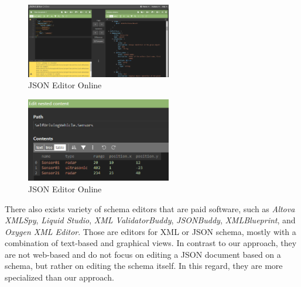 \begin{figure}[htb]
    \centering
    \includegraphics[width=2.5in]{figures/jsoneditoronline}
    \caption{JSON Editor Online}
    \label{fig:jsoneditoronline}
\end{figure}
\begin{figure}[htb]
    \centering
    \includegraphics[width=2.5in]{figures/jsoneditoronline-table}
    \caption{JSON Editor Online}
    \label{fig:jsoneditoronline_table}
\end{figure}

There also exists variety of schema editors that are paid software, such as \textit{Altova XMLSpy}\cite{altovaEditorXMLSpy},
\textit{Liquid Studio}\cite{liquidtechnologiesJSONSchema}, \textit{XML ValidatorBuddy}\cite{xmlbuddyEditorValidator},
\textit{JSONBuddy}\cite{jsonbuddyJSONSchema}, \textit{XMLBlueprint}\cite{xmlblueprintEditorXMLBlueprint},
and \textit{Oxygen XML Editor}\cite{oxygenxmlCompleteSolution}.
Those are editors for XML or JSON schema, mostly with a combination of text-based and graphical views.
In contrast to our approach, they are not web-based and do not focus on editing a JSON document based on a schema,
but rather on editing the schema itself.
In this regard, they are more specialized than our approach.

%
%
%

